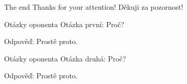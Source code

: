 \documentclass[czech,aspectratio=169]{beamer}
\begin{document}
    \begin{frame}{The end}
        \center Thanks for your attention!
        \center Děkuji za pozornost!
    \end{frame}

    \begin{frame}[noframenumbering]{Otázky oponenta}
        Otázka první: Proč?
    
        \vfill
    
        Odpověď: Prostě proto.
    \end{frame}
    
    \begin{frame}[noframenumbering]{Otázky oponenta}
        Otázka druhá: Proč?
    
        \vfill
    
        Odpověď: Prostě proto.
    \end{frame}
\end{document}
